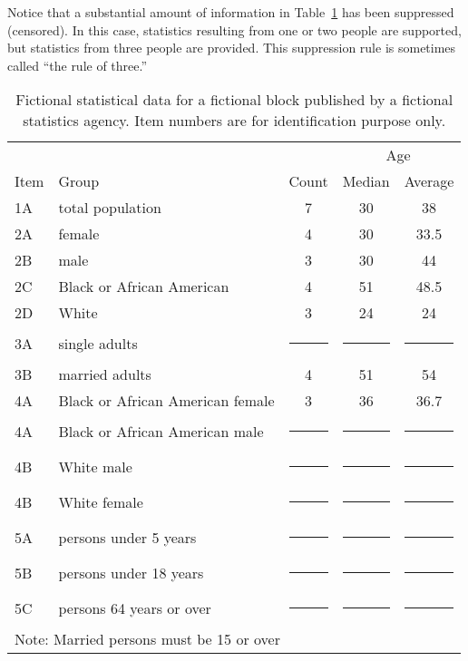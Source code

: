 \documentclass[runningheads]{llncs}
\begin{document}
Notice that a substantial amount of information in
Table~\ref{fictional} has been suppressed (censored). In this case,
statistics resulting from one or two people are supported, but
statistics from three people are provided. This suppression rule is
sometimes called ``the rule of three.''

\newcommand{\cens}{\multicolumn{1}{c|}{\rule{6mm}{3mm}}}
\begin{table}
\begin{center}
\begin{tabular}{l|l|c|c|c|}
     &                           &       & \multicolumn{2}{|c|}{Age} \\
Item & Group                     & Count & Median & Average \\
\hline
  1A & total population          & 7     &  30    & 38 \\
\hline
  2A & female                    & 4     &  30    & 33.5 \\
  2B & male                      & 3     &  30    & 44 \\
  2C & Black or African American & 4     &  51    & 48.5 \\
  2D & White                     & 3     &  24    & 24 \\
\hline
  3A & single adults             & \cens & \cens  & \cens \\
  3B & married adults            & 4     & 51     & 54 \\
\hline
  4A & Black or African American female              & 3     & 36     & 36.7 \\
  4A & Black or African American male                & \cens & \cens  & \cens \\
  4B & White male                & \cens & \cens  & \cens \\
  4B & White female              & \cens & \cens  & \cens \\
\hline
  5A & persons under 5 years     & \cens & \cens  & \cens \\
  5B & persons under 18 years    & \cens & \cens  & \cens \\
  5C & persons 64 years or over  & \cens & \cens  & \cens \\
\hline
\multicolumn{5}{l}{Note: Married persons must be 15 or over}
\end{tabular}
\caption{Fictional statistical data for a fictional block published by
  a fictional statistics agency. Item numbers are for identification
  purpose only.\label{fictional}}
\end{center}
\end{table}
\end{document}
